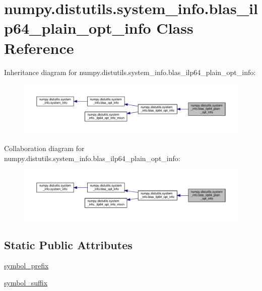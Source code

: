 \hypertarget{classnumpy_1_1distutils_1_1system__info_1_1blas__ilp64__plain__opt__info}{}\section{numpy.\+distutils.\+system\+\_\+info.\+blas\+\_\+ilp64\+\_\+plain\+\_\+opt\+\_\+info Class Reference}
\label{classnumpy_1_1distutils_1_1system__info_1_1blas__ilp64__plain__opt__info}


Inheritance diagram for numpy.\+distutils.\+system\+\_\+info.\+blas\+\_\+ilp64\+\_\+plain\+\_\+opt\+\_\+info\+:
\nopagebreak
\begin{figure}[H]
\begin{center}
\leavevmode
\includegraphics[width=350pt]{classnumpy_1_1distutils_1_1system__info_1_1blas__ilp64__plain__opt__info__inherit__graph}
\end{center}
\end{figure}


Collaboration diagram for numpy.\+distutils.\+system\+\_\+info.\+blas\+\_\+ilp64\+\_\+plain\+\_\+opt\+\_\+info\+:
\nopagebreak
\begin{figure}[H]
\begin{center}
\leavevmode
\includegraphics[width=350pt]{classnumpy_1_1distutils_1_1system__info_1_1blas__ilp64__plain__opt__info__coll__graph}
\end{center}
\end{figure}
\subsection*{Static Public Attributes}
\begin{DoxyCompactItemize}
\item 
\hyperlink{classnumpy_1_1distutils_1_1system__info_1_1blas__ilp64__plain__opt__info_a09213447e43f5a31213d7897e1864334}{symbol\+\_\+prefix}
\item 
\hyperlink{classnumpy_1_1distutils_1_1system__info_1_1blas__ilp64__plain__opt__info_a1389f80db3dff9aeab8e13a0937be02f}{symbol\+\_\+suffix}
\end{DoxyCompactItemize}
